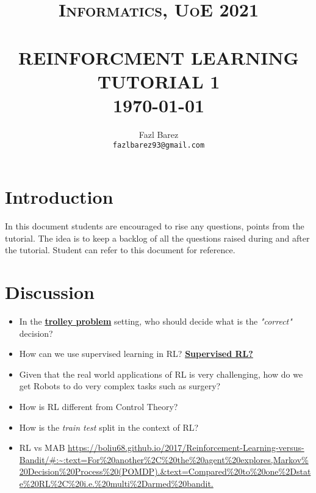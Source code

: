 \documentclass[paper=a4, fontsize=11pt,twoside]{scrartcl}	%
\title{	\normalsize \textsc{Informatics, UoE 2021} 	%
		 	\\[2.0cm]								%
			\HRule{0.5pt} \\						%
			\LARGE \textbf{\uppercase{Reinforcment Learning Tutorial 1}}	%
			\HRule{2pt} \\ [0.5cm]		%
			\normalsize \today			%
		}
\author{
		Fazl Barez\\	
        \texttt{fazlbarez93@gmail.com} \\
}
\makeatletter
\def\printtitle{%
    {\centering \@title\par}}
\def\printauthor{%
    {\centering \large \@author}}
\makeatother
\begin{document}
\thispagestyle{empty}		%

\printtitle					%
  	\vfill
\printauthor				%
\newpage
\setcounter{page}{1}		%
\section*{Introduction}

In this document students are encouraged to rise any questions, points from the tutorial. 
The idea is to keep a backlog of all the questions raised during and after the tutorial. Student can refer to this document for reference. 

\section*{Discussion}

\begin{itemize}
    \item {In the \href{https://en.wikipedia.org/wiki/Trolley_problem}{\textbf{trolley problem}} setting, who should decide what is the \textit{"correct"} decision?}
    \item {How can we use supervised learning in RL? \href{https://bair.berkeley.edu/blog/2020/10/13/supervised-rl/}{\textbf{Supervised RL?}}}
    \item{Given that the real world applications of RL is very challenging, how do we get Robots to do very complex tasks such as surgery?}
    \item How is RL different from Control Theory?
    \item {How is the \textit{train test} split in the context of RL?}
    \item{RL vs MAB \url{https://boliu68.github.io/2017/Reinforcement-Learning-versus-Bandit/#:~:text=For%20another%2C%20the%20agent%20explores,Markov%20Decision%20Process%20(POMDP).&text=Compared%20to%20one%2Dstate%20RL%2C%20i.e.%20multi%2Darmed%20bandit.}
    }
\end{itemize}
\end{document}
